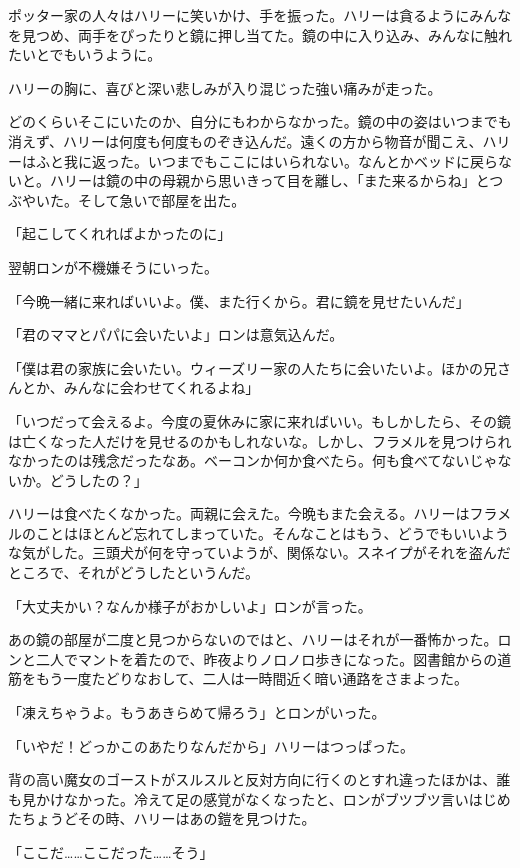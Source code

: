 \documentclass[10pt,a4paper]{article}
\begin{document}
\begin{CJK}{UTF8}{min}
ポッター家の人々はハリーに笑いかけ、手を振った。ハリーは貪るようにみんなを見つめ、両手をぴったりと鏡に押し当てた。鏡の中に入り込み、みんなに触れたいとでもいうように。

ハリーの胸に、喜びと深い悲しみが入り混じった強い痛みが走った。

どのくらいそこにいたのか、自分にもわからなかった。鏡の中の姿はいつまでも消えず、ハリーは何度も何度ものぞき込んだ。遠くの方から物音が聞こえ、ハリーはふと我に返った。いつまでもここにはいられない。なんとかベッドに戻らないと。ハリーは鏡の中の母親から思いきって目を離し、「また来るからね」とつぶやいた。そして急いで部屋を出た。



「起こしてくれればよかったのに」

翌朝ロンが不機嫌そうにいった。

「今晩一緒に来ればいいよ。僕、また行くから。君に鏡を見せたいんだ」

「君のママとパパに会いたいよ」ロンは意気込んだ。

「僕は君の家族に会いたい。ウィーズリー家の人たちに会いたいよ。ほかの兄さんとか、みんなに会わせてくれるよね」

「いつだって会えるよ。今度の夏休みに家に来ればいい。もしかしたら、その鏡は亡くなった人だけを見せるのかもしれないな。しかし、フラメルを見つけられなかったのは残念だったなあ。ベーコンか何か食べたら。何も食べてないじゃないか。どうしたの？」

ハリーは食べたくなかった。両親に会えた。今晩もまた会える。ハリーはフラメルのことはほとんど忘れてしまっていた。そんなことはもう、どうでもいいような気がした。三頭犬が何を守っていようが、関係ない。スネイプがそれを盗んだところで、それがどうしたというんだ。

「大丈夫かい？なんか様子がおかしいよ」ロンが言った。



あの鏡の部屋が二度と見つからないのではと、ハリーはそれが一番怖かった。ロンと二人でマントを着たので、昨夜よりノロノロ歩きになった。図書館からの道筋をもう一度たどりなおして、二人は一時間近く暗い通路をさまよった。

「凍えちゃうよ。もうあきらめて帰ろう」とロンがいった。

「いやだ！どっかこのあたりなんだから」ハリーはつっぱった。

背の高い魔女のゴーストがスルスルと反対方向に行くのとすれ違ったほかは、誰も見かけなかった。冷えて足の感覚がなくなったと、ロンがブツブツ言いはじめたちょうどその時、ハリーはあの鎧を見つけた。

「ここだ……ここだった……そう」


\end{CJK}
\end{document}
